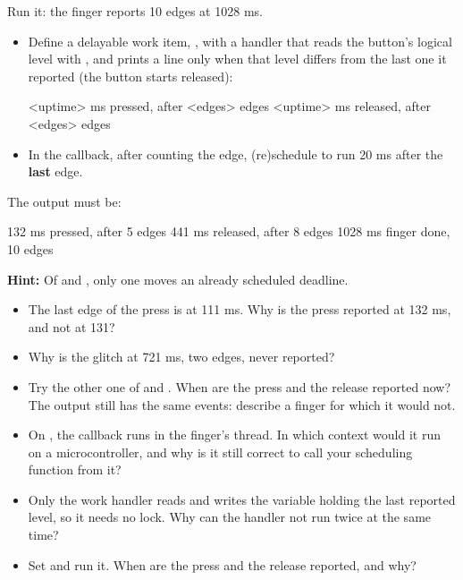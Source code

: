 Run it: the finger reports 10 edges at 1028 ms.

\label{c3:ex:3.2}

\begin{itemize}
  \item Define a delayable work item, , with a handler that reads the button’s logical
    level with , and prints a line only when that level differs from the last
    one it reported (the button starts released):
\begin{console}
<uptime> ms  pressed, after <edges> edges
<uptime> ms  released, after <edges> edges
\end{console}
  \item In the callback, after counting the edge, (re)schedule  to run 20 ms after the
    \textbf{last} edge.
\end{itemize}

The output must be:

\begin{console}
 132 ms  pressed, after 5 edges
 441 ms  released, after 8 edges
1028 ms  finger done, 10 edges
\end{console}

\textbf{Hint:} Of  and , only one moves an already
scheduled deadline.

\begin{itemize}
  \item The last edge of the press is at 111 ms. Why is the press reported at 132 ms, and not at 131?
  \item Why is the glitch at 721 ms, two edges, never reported?
  \item Try the other one of  and . When are the press and
    the release reported now? The output still has the same events: describe a finger for which it would
    not.
  \item On , the callback runs in the finger’s thread. In which context would it run on a
    microcontroller, and why is it still correct to call your scheduling function from it?
  \item Only the work handler reads and writes the variable holding the last reported level, so it needs no
    lock. Why can the handler not run twice at the same time?
  \item Set  and run it. When are the press and the release
    reported, and why?
\end{itemize}

